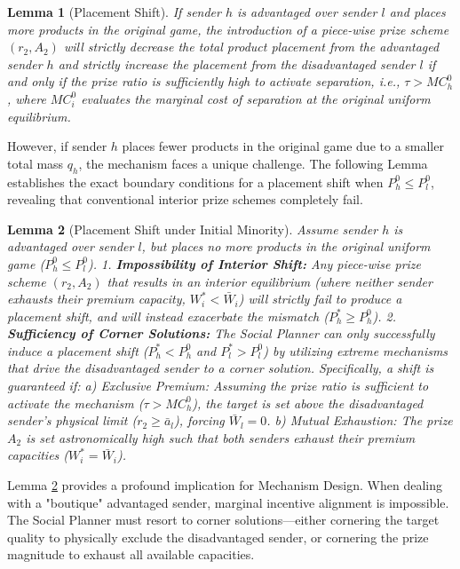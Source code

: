 \documentclass[12pt, a4paper]{article}
\newtheorem{lemma}{Lemma}
\begin{document}
\begin{lemma}[Placement Shift]
\label{Lemma: Placement Shift}
    If sender $h$ is advantaged over sender $l$ and places more products in the original game, the introduction of a piece-wise prize scheme $(r_2, A_2)$ will strictly decrease the total product placement from the advantaged sender $h$ and strictly increase the placement from the disadvantaged sender $l$ if and only if the prize ratio is sufficiently high to activate separation, i.e., $\tau > MC^0_h$, where $MC_i^0$ evaluates the marginal cost of separation at the original uniform equilibrium.
\end{lemma}

However, if sender $h$ places fewer products in the original game due to a smaller total mass $q_h$, the mechanism faces a unique challenge. The following Lemma establishes the exact boundary conditions for a placement shift when $P_h^0 \le P_l^0$, revealing that conventional interior prize schemes completely fail.

\begin{lemma}[Placement Shift under Initial Minority]
\label{Lemma: Boutique Advantaged Sender}
    Assume sender $h$ is advantaged over sender $l$, but places no more products in the original uniform game ($P_h^0 \le P_l^0$). 
    1. \textbf{Impossibility of Interior Shift:} Any piece-wise prize scheme $(r_2, A_2)$ that results in an interior equilibrium (where neither sender exhausts their premium capacity, $W_i^* < \bar{W}_i$) will strictly fail to produce a placement shift, and will instead exacerbate the mismatch ($P_h^* \ge P_h^0$).
    2. \textbf{Sufficiency of Corner Solutions:} The Social Planner can only successfully induce a placement shift ($P_h^* < P_h^0$ and $P_l^* > P_l^0$) by utilizing extreme mechanisms that drive the disadvantaged sender to a corner solution. Specifically, a shift is guaranteed if:
        a) \textit{Exclusive Premium:} Assuming the prize ratio is sufficient to activate the mechanism ($\tau > MC_h^0$), the target is set above the disadvantaged sender's physical limit ($r_2 \ge \bar{a}_l$), forcing $\bar{W}_l = 0$.
        b) \textit{Mutual Exhaustion:} The prize $A_2$ is set astronomically high such that both senders exhaust their premium capacities ($W_i^* = \bar{W}_i$).
\end{lemma}

Lemma \ref{Lemma: Boutique Advantaged Sender} provides a profound implication for Mechanism Design. When dealing with a "boutique" advantaged sender, marginal incentive alignment is impossible. The Social Planner must resort to corner solutions---either cornering the target quality to physically exclude the disadvantaged sender, or cornering the prize magnitude to exhaust all available capacities.
\end{document}
